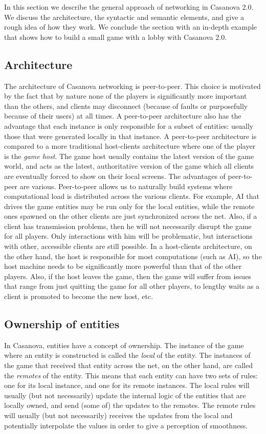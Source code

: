 In this section we describe the general approach of networking in Casanova 2.0. We discuss the architecture, the syntactic and semantic elements, and give a rough idea of how they work. We conclude the section with an in-depth example that shows how to build a small game with a lobby with Casanova 2.0.

\subsection{Architecture}
The architecture of Casanova networking is peer-to-peer. This choice is motivated by the fact that by nature none of the players is significantly more important than the others, and clients may disconnect (because of faults or purposefully because of their users) at all times. A peer-to-peer architecture also has the advantage that each instance is only responsible for a subset of entities: usually those that were generated locally in that instance. A peer-to-peer architecture is compared to a more traditional host-clients architecture where one of the player is the \textit{game host}. The game host usually contains the latest version of the game world, and acts as the latest, authoritative version of the game which all clients are eventually forced to show on their local screens. The advantages of peer-to-peer are various. Peer-to-peer allows us to naturally build systems where computational load is distributed across the various clients. For example, AI that drives the game entities may be run only for the local entities, while the remote ones spawned on the other clients are just synchronized across the net. Also, if a client has transmission problems, then he will not necessarily disrupt the game for all players. Only interactions with him will be problematic, but interactions with other, accessible clients are still possible. In a host-clients architecture, on the other hand, the host is responsible for most computations (such as AI), so the host machine needs to be significantly more powerful than that of the other players. Also, if the host leaves the game, then the game will suffer from issues that range from just quitting the game for all other players, to lengthy waits as a client is promoted to become the new host, etc.

\subsection{Ownership of entities}
In Casanova, entities have a concept of ownership. The instance of the game where an entity is constructed is called the \textit{local} of the entity. The instances of the game that received that entity across the net, on the other hand, are called the \textit{remotes} of the entity. This means that each entity can have two sets of rules: one for its local instance, and one for its remote instances. The local rules will usually (but not necessarily) update the internal logic of the entities that are locally owned, and send (some of) the updates to the remotes. The remote rules will usually (but not necessarily) receives the updates from the local and potentially interpolate the values in order to give a perception of smoothness.

